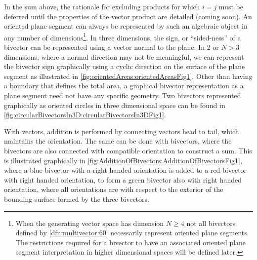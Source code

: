 In the sum above, the rationale for excluding products for which \( i = j \) must be deferred until the properties of the vector product are detailed (coming soon).
An oriented plane segment can always be represented by such an algebraic object in any number of dimensions\footnote{When the generating vector space has dimension \( N \ge 4 \) not all bivectors defined by \cref{dfn:multivector:60} necessarily represent oriented plane segments.
The restrictions required for a bivector to have an associated oriented plane segment interpretation in higher dimensional spaces will be defined later.}.
In three dimensions, the sign, or ``sided-ness'' of a bivector can be represented using a vector normal to the plane.
In 2 or \( N > 3 \) dimensions, where a normal
direction may not be meaningful, we can represent the bivector sign graphically using a cyclic direction on the surface of the plane segment as illustrated in
\cref{fig:orientedAreas:orientedAreasFig1}.
Other than having a boundary that defines the total area, a graphical bivector representation as a plane segment need not have any specific geometry.
Two bivectors represented graphically as oriented circles in three dimensional space can be found in
\cref{fig:circularBivectorsIn3D:circularBivectorsIn3DFig1}.

With vectors, addition is performed by connecting vectors head to tail, which maintains the orientation.
The same can be done with bivectors, where the bivectors are also connected with compatible orientation to construct a sum.
This is illustrated graphically in \cref{fig:AdditionOfBivectors:AdditionOfBivectorsFig1}, where a blue bivector with a right handed orientation is added to a red bivector with right handed orientation, to form a green bivector also with right handed orientation, where all orientations are with respect to the exterior of the bounding surface formed by the three bivectors.

%

